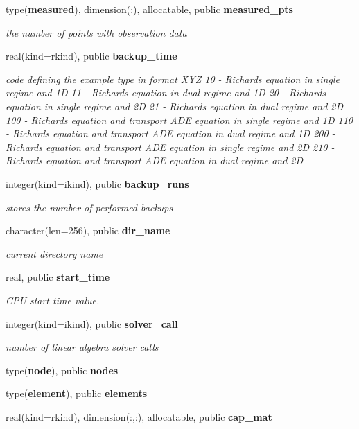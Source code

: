 \begin{DoxyCompactItemize}
type({\bf measured}), dimension(\+:), allocatable, public {\bf measured\+\_\+pts}
\begin{DoxyCompactList}\small\item\em the number of points with observation data \end{DoxyCompactList}\item 
real(kind=rkind), public {\bf backup\+\_\+time}
\begin{DoxyCompactList}\small\item\em code defining the example type in format X\+YZ 10 -\/ Richards equation in single regime and 1D 11 -\/ Richards equation in dual regime and 1D 20 -\/ Richards equation in single regime and 2D 21 -\/ Richards equation in dual regime and 2D 100 -\/ Richards equation and transport A\+DE equation in single regime and 1D 110 -\/ Richards equation and transport A\+DE equation in dual regime and 1D 200 -\/ Richards equation and transport A\+DE equation in single regime and 2D 210 -\/ Richards equation and transport A\+DE equation in dual regime and 2D \end{DoxyCompactList}\item 
integer(kind=ikind), public {\bf backup\+\_\+runs}
\begin{DoxyCompactList}\small\item\em stores the number of performed backups \end{DoxyCompactList}\item 
character(len=256), public {\bf dir\+\_\+name}
\begin{DoxyCompactList}\small\item\em current directory name \end{DoxyCompactList}\item 
real, public {\bf start\+\_\+time}
\begin{DoxyCompactList}\small\item\em C\+PU start time value. \end{DoxyCompactList}\item 
integer(kind=ikind), public {\bf solver\+\_\+call}
\begin{DoxyCompactList}\small\item\em number of linear algebra solver calls \end{DoxyCompactList}\item 
type({\bf node}), public {\bf nodes}
\item 
type({\bf element}), public {\bf elements}
\item 
real(kind=rkind), dimension(\+:,\+:), allocatable, public {\bf cap\+\_\+mat}

\end{DoxyCompactItemize}
